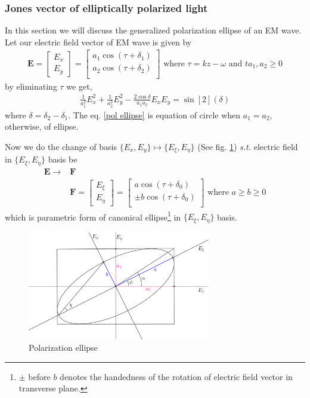 \documentclass[11pt,a4paper]{article}
\numberwithin{equation}{section}
\begin{document}
\subsubsection{Jones vector of elliptically polarized light}
In this section we will discuss the generalized polarization ellipse of an EM wave. Let our electric field vector of EM wave is given by
\begin{align}
	\boldsymbol{E} =
	\begin{bmatrix}
		E_x\\E_y
	\end{bmatrix}=
	\begin{bmatrix}
		a_1 \cos(\tau+\delta_1)\\
		a_2 \cos(\tau+\delta_2)\\
	\end{bmatrix}
	\text{ where }
	\tau = kz-\omega \text{ and } t a_1,a_2\ge0
\end{align}
by eliminating $\tau$ we get,
\begin{align}
	\frac{1}{a_1^2}E_x^2 +\frac{1}{a_2^2}E_y^2 -\frac{2\cos\delta}{a_1 a_2} E_x E_y = \sin[2](\delta)
	\label{pol ellipse}
\end{align}
where $\delta = \delta_2-\delta_1$.
The eq. \ref{pol ellipse} is equation of circle when $a_1 = a_2$, otherwise, of ellipse\cite{born-wolf}.

Now we do the change of basis $\{E_x,E_y\}\longmapsto\{E_\xi,E_\eta\}$ (See fig. \ref{fig:pol ellipse}) \textit{s.t.} electric field in $\{E_\xi,E_\eta\}$ basis be
\begin{align}
	\boldsymbol{E}\rightarrow&\boldsymbol{F}\nonumber\\
	&\boldsymbol{F} =
	\begin{bmatrix}
		E_\xi\\E_\eta
	\end{bmatrix}=
	\begin{bmatrix}
		a \cos(\tau+\delta_0)\\
		\pm b \cos(\tau+\delta_0)\\
	\end{bmatrix} \text{ where } a\ge b\ge 0
\end{align}
which is parametric form of canonical ellipse\footnote{$\pm$ before $b$ denotes the handedness of the rotation of electric field vector in transverse plane.} in $\{E_\xi,E_\eta\}$ basis.
\begin{figure}[H]
	\centering
	\includegraphics[width=8cm]{ellipse.png}
	\caption{Polarization ellipse}
	\label{fig:pol ellipse}
\end{figure}
\end{document}
